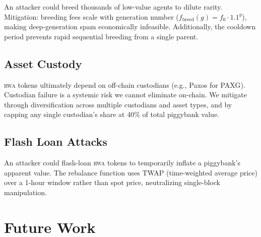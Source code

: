 \documentclass[11pt,letterpaper]{article}
\newcommand{\RWA}{\textsc{rwa}}
\begin{document}
An attacker could breed thousands of low-value agents to dilute rarity. Mitigation: breeding fees scale with generation number ($f_{\text{breed}}(g) = f_0 \cdot 1.1^g$), making deep-generation spam economically infeasible. Additionally, the cooldown period prevents rapid sequential breeding from a single parent.

\subsection{Asset Custody}

\RWA{} tokens ultimately depend on off-chain custodians (e.g., Paxos for PAXG). Custodian failure is a systemic risk we cannot eliminate on-chain. We mitigate through diversification across multiple custodians and asset types, and by capping any single custodian's share at 40\% of total piggybank value.

\subsection{Flash Loan Attacks}

An attacker could flash-loan \RWA{} tokens to temporarily inflate a piggybank's apparent value. The rebalance function uses TWAP (time-weighted average price) over a 1-hour window rather than spot price, neutralizing single-block manipulation.

\section{Future Work}
\label{sec:future}
\end{document}
